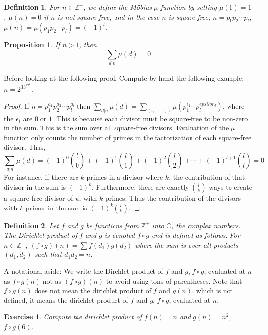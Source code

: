 \documentclass{article}
\theoremstyle{problemstyle}
\newtheorem{proposition}{Proposition}
\newtheorem{exercise}{Exercise}
\newtheorem{definition}{Definition}
\begin{document}
\begin{definition}
For $n \in \mathbb{Z}^{+}$, we define the M\"obius $\mu$ function by setting $\mu(1) = 1$, $\mu(n) = 0$ if $n$ is not square-free, and in the case $n$ is square free, $n = p_1p_2\cdots p_l$, $\mu(n) = \mu(p_1p_2\cdots p_l) = (-1)^{l}$. 
\end{definition}

\begin{proposition}
If $n > 1$, then $$\sum_{d|n}\mu(d) = 0$$
\end{proposition}

Before looking at the following proof. Compute by hand the following example: $n = 2^33^47^2$.
\begin{proof}
If $n = p_1^{a_1}p_2^{a_2}\cdots p_l^{a_l}$ then $\sum_{d|n}\mu(d) = \sum_(\epsilon_1,\ldots,\epsilon_l)\mu(p_1^{\epsilon_1}\cdots p_l^{epsilon_l})$, where the $\epsilon_i$ are $0$ or $1$. This is because each divisor must be square-free to be non-zero in the sum. This is the sum over all square-free divisors. Evaluation of the $\mu$ function only counts the number of primes in the factorization of each square-free divisor. Thus, 
$$\sum_{d|n}\mu(d) = (-1)^0\binom{l}{0} + (-1)^1\binom{l}{1} + (-1)^2\binom{l}{2}+\cdots+(-1)^{l+1}\binom{l}{l} = 0$$ 
For instance, if there are $k$ primes in a divisor where $k$, the contribution of that divisor in the sum is $(-1)^k$. Furthermore, there are exactly $\binom{l}{k}$ ways to create a square-free divisor of $n$, with $k$ primes. Thus the contribution of the divisors with $k$ primes in the sum is $(-1)^k\binom{l}{k}$.     
\end{proof}

\begin{definition}
Let $f$ and $g$ be functions from $\mathbb{Z}^{+}$ into $\mathbb{C}$, the complex numbers. The Dirichlet product of $f$ and $g$ is denoted $f\circ g$ and is defined as follows. For $n \in \mathbb{Z}^{+}$, $(f\circ g)(n) = \sum f(d_1)g(d_2)$ where the sum is over all products $(d_1,d_2)$ such that $d_1d_2 = n$.   
\end{definition}

A notational aside: We write the Dirchlet product of $f$ and $g$, $f\circ g$, evaluated at $n$ as $f\circ g(n)$ not as $(f\circ g)(n)$ to avoid using tons of parentheses. Note that $f\circ g(n)$ does not mean the dirichlet product of $f$ and $g(n)$, which is not defined, it means the dirichlet product of $f$ and $g$, $f\circ g$, evaluated at $n$. 
 
\begin{exercise}
Compute the dirichlet product of $f(n) = n$ and $g(n) = n^2$, $f\circ g(6)$. 
\end{exercise}
 
\end{document}

